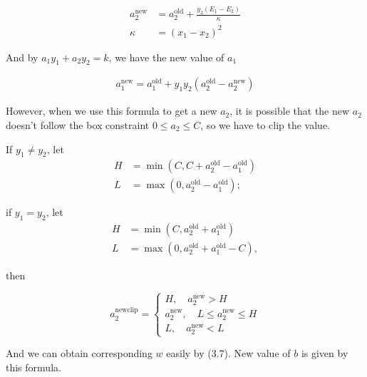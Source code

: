 \documentclass[a4paper]{report}
\begin{document}
\begin{align}
    a_2^{\mathrm{new}} &= a_2^{\mathrm{old}}+\frac{y_2(E_1-E_2)}{\kappa} \\
    \kappa &=(x_1-x_2)^2
\end{align}

And by $a_1y_1+a_2y_2=k$, we have the new value of $a_1$

\begin{align}
    a_1^{\mathrm{new}}=a_1^{\mathrm{old}}+ y_1y_2(a_2^{\mathrm{old}}- a_2^{\mathrm{new}})
\end{align}


%

However, when we use this formula to get a new $a_2$, it is possible that the new $a_2$ doesn't follow the box constraint $0\leq a_2\leq C$, so we have to clip the value.

If $y_1\neq y_2$, let 
\begin{align*}
    H&=\min(C,C+a_2^{\mathrm{old}}-a_1^{\mathrm{old}}) \\
    L&=\max(0,a_2^{\mathrm{old}}-a_1^{\mathrm{old}});
\end{align*}

if $y_1=y_2$,  let 
\begin{align*}
    H&=\min(C,a_2^{\mathrm{old}}+a_1^{\mathrm{old}}) \\
    L&=\max(0,a_2^{\mathrm{old}}+a_1^{\mathrm{old}}-C),
\end{align*}

then

\[
    a_2^{\mathrm{new clip}} = 
    \begin{cases}
        H, \quad a_2^{\mathrm{new}}>H \\
        a_2^{\mathrm{new}}, \quad L\leq a_2^{\mathrm{new}} \leq H \\
        L, \quad a_2^{\mathrm{new}} <L
    \end{cases}
\]

And we can obtain corresponding $w$ easily by (3.7). New value of $b$ is given by this formula.
\end{document}
